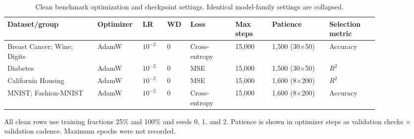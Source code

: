 \begin{table}[t]
\centering
\caption{Clean benchmark optimization and checkpoint settings. Identical model-family settings are collapsed.}
\begin{tabular}{@{}p{0.22\linewidth}p{0.08\linewidth}p{0.06\linewidth}p{0.05\linewidth}p{0.11\linewidth}p{0.09\linewidth}p{0.14\linewidth}p{0.12\linewidth}@{}}
\toprule
Dataset/group & Optimizer & LR & WD & Loss & Max steps & Patience & Selection metric \\
\midrule
Breast Cancer; Wine; Digits & AdamW & $10^{-2}$ & 0 & Cross-entropy & 15,000 & 1,500 (30$\times$50) & Accuracy \\
Diabetes & AdamW & $10^{-2}$ & 0 & MSE & 15,000 & 1,500 (30$\times$50) & $R^2$ \\
California Housing & AdamW & $10^{-2}$ & 0 & MSE & 15,000 & 1,600 (8$\times$200) & $R^2$ \\
MNIST; Fashion-MNIST & AdamW & $10^{-2}$ & 0 & Cross-entropy & 15,000 & 1,600 (8$\times$200) & Accuracy \\
\bottomrule
\end{tabular}
\parbox{0.98\linewidth}{\footnotesize All clean rows use training fractions 25\% and 100\% and seeds 0, 1, and 2. Patience is shown in optimizer steps as validation checks $\times$ validation cadence. Maximum epochs were not recorded.}
\end{table}


